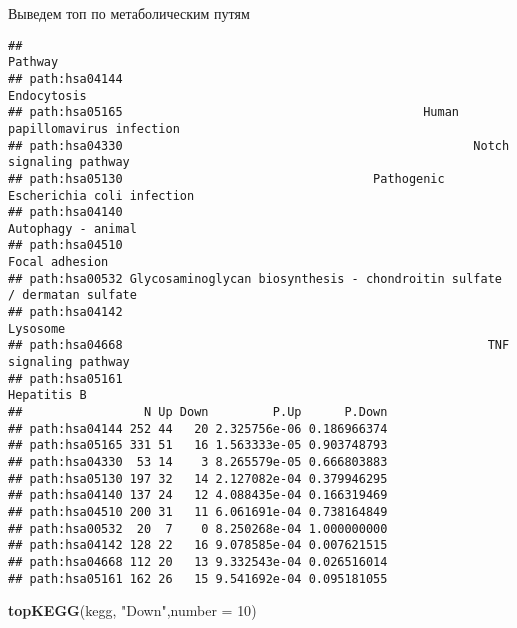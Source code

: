 \documentclass[
]{article}
\newenvironment{Shaded}{\begin{snugshade}}{\end{snugshade}}
\newcommand{\DataTypeTok}[1]{\textcolor[rgb]{0.13,0.29,0.53}{#1}}
\newcommand{\DecValTok}[1]{\textcolor[rgb]{0.00,0.00,0.81}{#1}}
\newcommand{\KeywordTok}[1]{\textcolor[rgb]{0.13,0.29,0.53}{\textbf{#1}}}
\newcommand{\NormalTok}[1]{#1}
\newcommand{\OperatorTok}[1]{\textcolor[rgb]{0.81,0.36,0.00}{\textbf{#1}}}
\newcommand{\StringTok}[1]{\textcolor[rgb]{0.31,0.60,0.02}{#1}}
\begin{document}
Выведем топ по метаболическим путям

\begin{Shaded}
\end{Shaded}

\begin{verbatim}
##                                                                               Pathway
## path:hsa04144                                                             Endocytosis
## path:hsa05165                                          Human papillomavirus infection
## path:hsa04330                                                 Notch signaling pathway
## path:hsa05130                                   Pathogenic Escherichia coli infection
## path:hsa04140                                                      Autophagy - animal
## path:hsa04510                                                          Focal adhesion
## path:hsa00532 Glycosaminoglycan biosynthesis - chondroitin sulfate / dermatan sulfate
## path:hsa04142                                                                Lysosome
## path:hsa04668                                                   TNF signaling pathway
## path:hsa05161                                                             Hepatitis B
##                 N Up Down         P.Up      P.Down
## path:hsa04144 252 44   20 2.325756e-06 0.186966374
## path:hsa05165 331 51   16 1.563333e-05 0.903748793
## path:hsa04330  53 14    3 8.265579e-05 0.666803883
## path:hsa05130 197 32   14 2.127082e-04 0.379946295
## path:hsa04140 137 24   12 4.088435e-04 0.166319469
## path:hsa04510 200 31   11 6.061691e-04 0.738164849
## path:hsa00532  20  7    0 8.250268e-04 1.000000000
## path:hsa04142 128 22   16 9.078585e-04 0.007621515
## path:hsa04668 112 20   13 9.332543e-04 0.026516014
## path:hsa05161 162 26   15 9.541692e-04 0.095181055
\end{verbatim}

\begin{Shaded}
\begin{Highlighting}[]
\KeywordTok{topKEGG}\NormalTok{(kegg, }\StringTok{"Down"}\NormalTok{,}\DataTypeTok{number =} \DecValTok{10}\NormalTok{)}
\end{Highlighting}
\end{Shaded}
\end{document}
